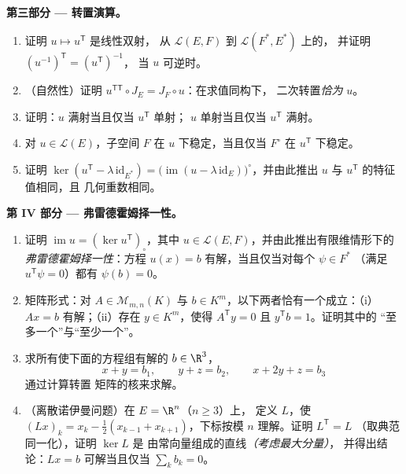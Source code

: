 \begin{problem}
\medskip
\noindent\textbf{第三部分 --- 转置演算。}
\begin{enumerate}[resume]
  \item 证明 $u \mapsto u^{\mathsf T}$ 是线性双射，
        从 $\mathcal{L}(E, F)$ 到 $\mathcal{L}(F^*, E^*)$ 上的，
        并证明 $(u^{-1})^{\mathsf T} = (u^{\mathsf T})^{-1}$，
        当 $u$ 可逆时。
  \item （自然性）证明 $u^{\mathsf T\mathsf T} \circ J_E
        = J_F \circ u$：在求值同构下，
        二次转置\emph{恰为} $u$。
  \item 证明：$u$ 满射当且仅当 $u^{\mathsf T}$ 单射；
        $u$ 单射当且仅当 $u^{\mathsf T}$ 满射。
  \item 对 $u \in \mathcal{L}(E)$，子空间 $F$ 在
        $u$ 下稳定，当且仅当 $F^\circ$ 在
        $u^{\mathsf T}$ 下稳定。
  \item 证明 $\ker(u^{\mathsf T} - \lambda\,
        \mathrm{id}_{E^*}) = \bigl(\operatorname{im}(u - \lambda\,
        \mathrm{id}_E)\bigr)^\circ$，并由此推出 $u$ 与
        $u^{\mathsf T}$ 的特征值相同，且
        几何重数相同。
\end{enumerate}

\medskip
\noindent\textbf{第 IV 部分 --- 弗雷德霍姆择一性。}
\begin{enumerate}[resume]
  \item 证明 $\operatorname{im} u = (\ker u^{\mathsf
        T})_\circ$，其中 $u \in \mathcal{L}(E, F)$，并由此推出有限维情形下的
        \emph{弗雷德霍姆择一性}：方程
        $u(x) = b$ 有解，当且仅当对每个 $\psi \in F^*$
        （满足 $u^{\mathsf T}\psi = 0$）都有
        $\psi(b) = 0$。
  \item 矩阵形式：对 $A \in \mathcal{M}_{m,n}(K)$ 与 $b \in
        K^m$，以下两者恰有一个成立：（i）$Ax = b$
        有解；（ii）存在 $y \in K^m$，使得
        $A^{\mathsf T}y = 0$ 且 $y^{\mathsf T}b = 1$。证明其中的
        “至多一个”与“至少一个”。
  \item 求所有使下面的方程组有解的 $b \in \R^3$，
        \[
        x + y = b_1, \qquad y + z = b_2, \qquad x + 2y + z = b_3
        \]
        通过计算转置
        矩阵的核来求解。
  \item （离散诺伊曼问题）在 $E = \R^n$（$n \geq 3$）上，
        定义 $L$，使 $(Lx)_k = x_k - \frac12(x_{k-1} +
        x_{k+1})$，下标按模 $n$ 理解。证明 $L^{\mathsf T} = L$
        （取典范同一化），证明 $\ker L$ 是
        由常向量组成的直线\emph{（考虑最大分量）}，
        并得出结论：$Lx = b$ 可解当且仅当 $\sum_k b_k = 0$。
\end{enumerate}


\end{problem}
